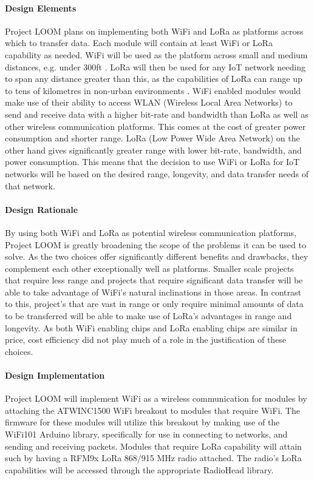 \documentclass[onecolumn, draftclsnofoot,10pt, compsoc]{IEEEtran}
\begin{document}
\paragraph{Design Elements}
Project LOOM plans on implementing both WiFi and LoRa as platforms across which to transfer data. Each module will contain at least WiFi or LoRa capability as needed. WiFi will be used as the platform across small and medium distances, e.g. under 300ft \cite{WiFi}. LoRa will then be used for any IoT network needing to span any distance greater than this, as the capabilities of LoRa can range up to tens of kilometres in non-urban environments \cite{LoRa}. WiFi enabled modules would make use of their ability to access WLAN (Wireless Local Area Networks) to send and receive data with a higher bit-rate and bandwidth than LoRa as well as other wireless communication platforms. This comes at the cost of greater power consumption and shorter range. LoRa (Low Power Wide Area Network) on the other hand gives significantly greater range with lower bit-rate, bandwidth, and power consumption. This means that the decision to use WiFi or LoRa for IoT networks will be based on the desired range, longevity, and data transfer needs of that network.

\paragraph{Design Rationale}
By using both WiFi and LoRa as potential wireless communication platforms, Project LOOM is greatly broadening the scope of the problems it can be used to solve. As the two choices offer significantly different benefits and drawbacks, they complement each other exceptionally well as platforms. Smaller scale projects that require less range and projects that require significant data transfer will be able to take advantage of WiFi's natural inclinations in those areas. In contrast to this, project's that are vast in range or only require minimal amounts of data to be transferred will be able to make use of LoRa's advantages in range and longevity. As both WiFi enabling chips and LoRa enabling chips are similar in price, cost efficiency did not play much of a role in the justification of these choices. 

\paragraph{Design Implementation}
Project LOOM will implement WiFi as a wireless communication for modules by attaching the ATWINC1500 WiFi breakout to modules that require WiFi. The firmware for these modules will utilize this breakout by making use of the WiFi101 Arduino library, specifically for use in connecting to networks, and sending and receiving packets. Modules that require LoRa capability will attain such by having a RFM9x LoRa 868/915 MHz radio attached. The radio's LoRa capabilities will be accessed through the appropriate RadioHead library. 
\end{document}
